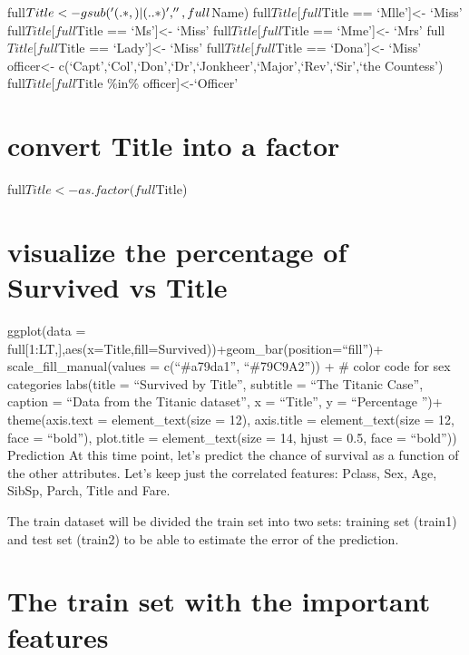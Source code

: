 \documentclass[
]{article}
\begin{document}
full\(Title <- gsub('(.*, )|(\\..*)', '', full\)Name)
full\(Title[full\)Title == `Mlle'{]}\textless- `Miss'
full\(Title[full\)Title == `Ms'{]}\textless- `Miss'
full\(Title[full\)Title == `Mme'{]}\textless- `Mrs'
full\(Title[full\)Title == `Lady'{]}\textless- `Miss'
full\(Title[full\)Title == `Dona'{]}\textless- `Miss' officer\textless-
c(`Capt',`Col',`Don',`Dr',`Jonkheer',`Major',`Rev',`Sir',`the Countess')
full\(Title[full\)Title \%in\% officer{]}\textless-`Officer'

\hypertarget{convert-title-into-a-factor}{%
\section{convert Title into a
factor}\label{convert-title-into-a-factor}}

full\(Title<- as.factor(full\)Title)

\hypertarget{visualize-the-percentage-of-survived-vs-title}{%
\section{visualize the percentage of Survived vs
Title}\label{visualize-the-percentage-of-survived-vs-title}}

ggplot(data =
full{[}1:LT,{]},aes(x=Title,fill=Survived))+geom\_bar(position=``fill'')+
scale\_fill\_manual(values = c(``\#a79da1'', ``\#79C9A2'')) + \# color
code for sex categories labs(title = ``Survived by Title'', subtitle =
``The Titanic Case'', caption = ``Data from the Titanic dataset'', x =
``\n Title'', y = ``Percentage \n'')+ theme(axis.text =
element\_text(size = 12), axis.title = element\_text(size = 12, face =
``bold''), plot.title = element\_text(size = 14, hjust = 0.5, face =
``bold'')) Prediction At this time point, let's predict the chance of
survival as a function of the other attributes. Let's keep just the
correlated features: Pclass, Sex, Age, SibSp, Parch, Title and Fare.

The train dataset will be divided the train set into two sets: training
set (train1) and test set (train2) to be able to estimate the error of
the prediction.

\hypertarget{the-train-set-with-the-important-features}{%
\section{The train set with the important
features}\label{the-train-set-with-the-important-features}}
\end{document}
